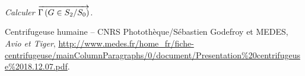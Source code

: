 \documentclass[10pt,oneside]{article}
\begin{document}
\subparagraph{}
\textit{Calculer $\overrightarrow{\Gamma \left( {G} \in {S_2}/{S_0}\right)}$.}


\begin{thebibliography}{2}
 Centrifugeuse humaine -- CNRS Photothèque/Sébastien Godefroy et MEDES, \textit{Avio et Tiger}, \url{http://www.medes.fr/home_fr/fiche-centrifugeuse/mainColumnParagraphs/0/document/Presentation%20centrifugeuse%2018.12.07.pdf}.
\end{thebibliography}
\end{document}

